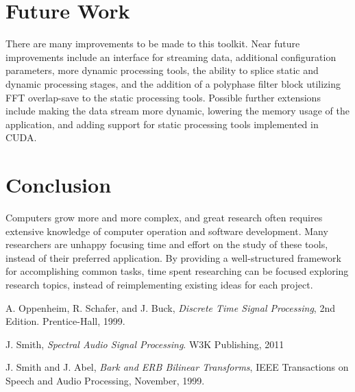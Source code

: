 \documentclass[journal]{IEEEtran}
\begin{document}
\section{Future Work}
There are many improvements to be made to this toolkit. Near future improvements include an interface for streaming data, additional configuration
parameters, more dynamic processing tools, the ability to splice static and dynamic processing stages, and the addition of a polyphase filter block utilizing FFT overlap-save to the static processing tools. Possible further extensions include making the data stream more dynamic, 
lowering the memory usage of the application, and adding support for static processing tools implemented in CUDA.

\section{Conclusion}
Computers grow more and more complex, and great research often requires extensive knowledge of computer operation and software development. Many
 researchers are unhappy focusing time and effort on the study of these tools, instead of their preferred application. By providing a well-structured
 framework for accomplishing common tasks, time spent researching can be focused exploring research topics, instead of reimplementing existing 
ideas for each project.

\begin{thebibliography}{1}
A. Oppenheim, R. Schafer, and J. Buck, \emph{Discrete Time Signal Processing}, 2nd Edition. Prentice-Hall, 1999.

J. Smith, \emph{Spectral Audio Signal Processing}. W3K Publishing, 2011

J. Smith and J. Abel, \emph{Bark and ERB Bilinear Transforms}, IEEE Transactions on Speech and Audio Processing, November, 1999.
\end{thebibliography}






\end{document}
